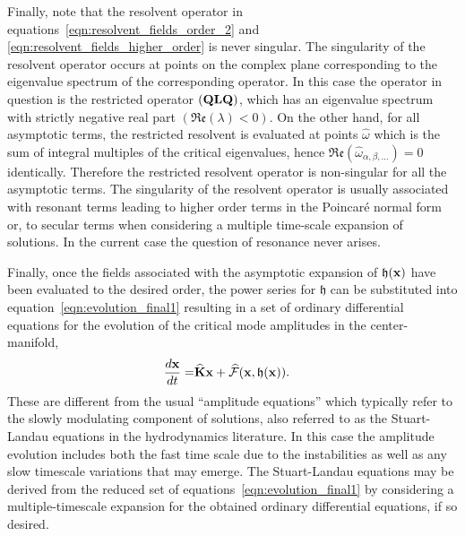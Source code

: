 Finally, note that the resolvent operator in equations~\eqref{eqn:resolvent_fields_order_2} and \eqref{eqn:resolvent_fields_higher_order} is never singular. The singularity of the resolvent operator occurs at points on the complex plane corresponding to the eigenvalue spectrum of the corresponding operator. In this case the operator in question is the restricted operator $(\mathbf{Q}\mathbf{L}\mathbf{Q})$, which has an eigenvalue spectrum with strictly negative real part $(\mathfrak{Re}(\lambda) < 0)$. On the other hand, for all asymptotic terms, the restricted resolvent is evaluated at points $\widehat{\omega}$ which is the sum of integral multiples of the critical eigenvalues, hence $\mathfrak{Re}(\widehat{\omega}_{\alpha,\beta,\ldots}) = 0$ identically. Therefore the restricted resolvent operator is non-singular for all the asymptotic terms. The singularity of the resolvent operator is usually associated with resonant terms leading to higher order terms in the Poincar\'{e} normal form or, to secular terms when considering a multiple time-scale expansion of solutions. In the current case the question of resonance never arises. 

Finally, once the fields associated with the asymptotic expansion of $\mathfrak{h}(\mathbf{x})$ have been evaluated to the desired order, the power series for $\mathfrak{h}$ can be substituted into equation~\eqref{eqn:evolution_final1} resulting in a set of ordinary differential equations for the evolution of the critical mode amplitudes in the center-manifold,
\begin{align}
	\dfrac{d\mathbf{x}}{d t} =& \mathbf{\widehat{K}}\mathbf{x} + \mathcal{\widehat{F}}(\mathbf{x},\mathfrak{h}(\mathbf{x})) \label{eqn:amplitude}.
\end{align}
These are different from the usual ``amplitude equations'' \cite{newell69,cross80,cross09} which typically refer to the slowly modulating component of solutions, also referred to as the Stuart-Landau equations \citep{stuart58,stuart60,sipp07} in the hydrodynamics literature. In this case the amplitude evolution includes both the fast time scale due to the instabilities as well as any slow timescale variations that may emerge. The Stuart-Landau equations may be derived from the reduced set of equations~\eqref{eqn:evolution_final1} by considering a multiple-timescale expansion for the obtained ordinary differential equations, if so desired. 


















